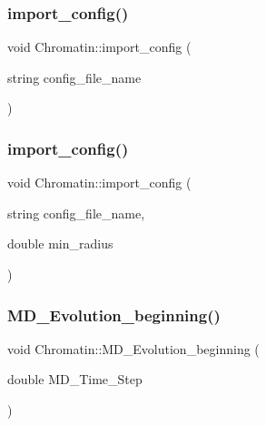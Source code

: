 \mbox{\label{classChromatin_a6e4c5827ebb4cd31cac05c05f5999ded}} 
\subsubsection{\texorpdfstring{import\_config()}{import\_config()}\hspace{0.1cm}{\footnotesize\ttfamily [1/2]}}
{\footnotesize\ttfamily void Chromatin\+::import\+\_\+config (\begin{DoxyParamCaption}\item[{string}]{config\+\_\+file\+\_\+name }\end{DoxyParamCaption})}

\mbox{\label{classChromatin_abb34912c862c4377fce32172d481075b}} 
\subsubsection{\texorpdfstring{import\_config()}{import\_config()}\hspace{0.1cm}{\footnotesize\ttfamily [2/2]}}
{\footnotesize\ttfamily void Chromatin\+::import\+\_\+config (\begin{DoxyParamCaption}\item[{string}]{config\+\_\+file\+\_\+name,  }\item[{double}]{min\+\_\+radius }\end{DoxyParamCaption})}

\mbox{\label{classChromatin_a7b7d1c6dd9bbd70c9efe5cfd180dc008}} 
\subsubsection{\texorpdfstring{MD\_Evolution\_beginning()}{MD\_Evolution\_beginning()}}
{\footnotesize\ttfamily void Chromatin\+::\+M\+D\+\_\+\+Evolution\+\_\+beginning (\begin{DoxyParamCaption}\item[{double}]{M\+D\+\_\+\+Time\+\_\+\+Step }\end{DoxyParamCaption})}

